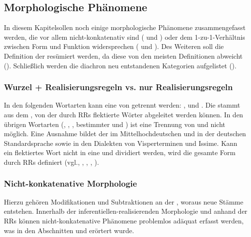 \subsection{Morphologische Phänomene}\label{5.7.3}

In diesem Kapitel\largerpage[2] sollen noch einige morphologische Phänomene zusammengefasst werden, die vor allem nicht-konkatenativ sind ( und ) oder dem 1-zu-1-Verhältnis zwischen Form und Funktion widersprechen ( und ). Des Weiteren soll die Definition der  resümiert werden, da diese von den meisten Definitionen abweicht (). Schließlich werden die diachron neu entstandenen Kategorien aufgelistet ().

\subsubsection{Wurzel + Realisierungsregeln vs. nur Realisierungsregeln}\label{5.7.3.1}

In den folgenden Wortarten kann eine  von  getrennt werden: ,  und . Die  stammt aus dem , von der durch RRs flektierte Wörter abgeleitet werden können. In den übrigen Wortarten (, , , bestimmter und ) ist eine Trennung von  und  nicht möglich. Eine Ausnahme bildet der  im Mittelhochdeutschen und in der deutschen Standardsprache sowie in den Dialekten von Visperterminen und Issime. Kann ein flektiertes Wort nicht in eine  und  dividiert werden, wird die gesamte Form durch RRs definiert (vgl., , , , ).

\subsubsection{Nicht-konkatenative Morphologie}\label{5.7.3.2}

Hierzu gehören Modifikationen und Subtraktionen an der , woraus neue Stämme entstehen. Innerhalb der in\-fe\-ren\-tiel\-len-re\-a\-li\-sie\-ren\-den Morphologie und anhand der RRs können nicht-konkatenative Phänomene problemlos adäquat erfasst werden, was in den Abschnitten  und  erörtert wurde.

